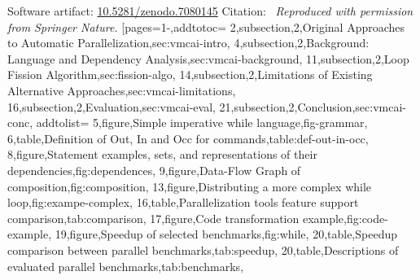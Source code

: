 \pageIconOpt
{}
{\noindent Software artifact: \href{https://zenodo.org/records/7080145}{10.5281/zenodo.7080145}
\newline\noindent Citation:~\cite{aubert202213}
\newline\newline\textit{Reproduced with permission from Springer Nature.}}
[pages={1-},addtotoc={
    2,subsection,2,{Original Approaches to Automatic Parallelization},sec:vmcai-intro,
    4,subsection,2,{Background: Language and Dependency Analysis},sec:vmcai-background,
    11,subsection,2,{Loop Fission Algorithm},sec:fission-algo,
    14,subsection,2,{Limitations of Existing Alternative Approaches},sec:vmcai-limitations,
    16,subsection,2,{Evaluation},sec:vmcai-eval,
    21,subsection,2,{Conclusion},sec:vmcai-conc},
    addtolist={
        5,figure,{Simple imperative while language},fig-grammar,
        6,table,{Definition of Out, In and Occ for commands},table:def-out-in-occ,
        8,figure,{Statement examples, sets, and representations of their dependencies},fig:dependences,
        9,figure,Data-Flow Graph of composition,fig:composition,
        13,figure,Distributing a more complex while loop,fig:exampe-complex,
        16,table,Parallelization tools feature support comparison,tab:comparison,
        17,figure,Code transformation example,fig:code-example,
        19,figure,Speedup of selected benchmarks,fig:while,
        20,table,Speedup comparison between parallel benchmarks,tab:speedup,
        20,table,Descriptions of evaluated parallel benchmarks,tab:benchmarks},
